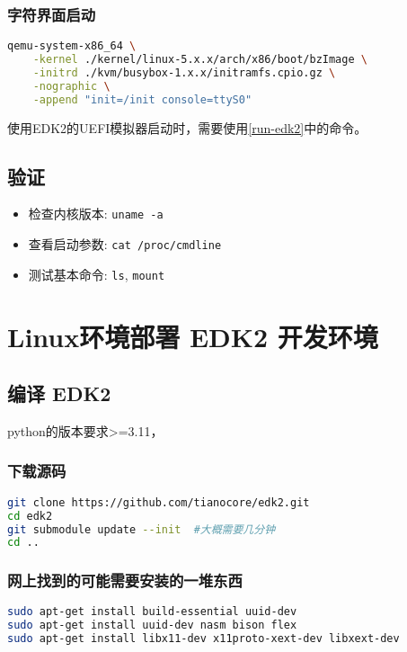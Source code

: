 \subsubsection{字符界面启动}
\begin{lstlisting}[language=bash, showstringspaces=false]
qemu-system-x86_64 \
    -kernel ./kernel/linux-5.x.x/arch/x86/boot/bzImage \
    -initrd ./kvm/busybox-1.x.x/initramfs.cpio.gz \
    -nographic \
    -append "init=/init console=ttyS0"
\end{lstlisting}

使用EDK2的UEFI模拟器启动时，需要使用\ref{run-edk2}中的命令。

\subsection{验证}
\begin{itemize}
    \item 检查内核版本: \texttt{uname -a}
    \item 查看启动参数: \texttt{cat /proc/cmdline}
    \item 测试基本命令: \texttt{ls}, \texttt{mount}
\end{itemize}

\section{Linux环境部署 EDK2 开发环境}

\subsection{编译 EDK2}

python的版本要求>=3.11，

\subsubsection{下载源码}
\begin{lstlisting}[language=bash]
git clone https://github.com/tianocore/edk2.git
cd edk2
git submodule update --init  #大概需要几分钟
cd ..
\end{lstlisting}

\subsubsection{网上找到的可能需要安装的一堆东西} \label{compile-edk2}

\begin{lstlisting}[language=bash]
sudo apt-get install build-essential uuid-dev
sudo apt-get install uuid-dev nasm bison flex
sudo apt-get install libx11-dev x11proto-xext-dev libxext-dev
\end{lstlisting}

